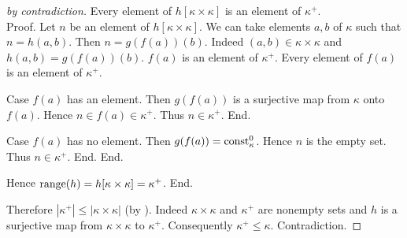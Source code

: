 \documentclass{article}
\begin{document}
\begin{forthel}
\begin{proof}[by contradiction]
        Every element of $h[\kappa \times \kappa]$ is an element of $\kappa^+$. \\
        Proof.
          Let $n$ be an element of $h[\kappa \times \kappa]$.
          We can take elements $a, b$ of $\kappa$ such that $n = h(a,b)$.
          Then $n = g(f(a))(b)$.
          Indeed $(a,b) \in \kappa \times \kappa$ and $h(a,b) = g(f(a))(b)$.
          $f(a)$ is an element of $\kappa^+$.
          Every element of $f(a)$ is an element of $\kappa^+$.

          Case $f(a)$ has an element.
            Then $g(f(a))$ is a surjective map from $\kappa$ onto $f(a)$.
            Hence $n \in f(a) \in \kappa^+$.
            Thus $n \in \kappa^+$.
          End.

          Case $f(a)$ has no element.
            Then $g(f(a)) = \textrm{const}_{\kappa}^{0}$.
            Hence $n$ is the empty set.
            Thus $n \in \kappa^+$.
          End.
        End.

        Hence $\textrm{range}(h) = h[\kappa \times \kappa] = \kappa^+$.
      End.

      Therefore $|\kappa^+| \leq |\kappa \times \kappa|$ (by ).
      Indeed $\kappa \times \kappa$ and $\kappa^+$ are nonempty sets and $h$ is a surjective map from $\kappa \times \kappa$ to $\kappa^+$.
      Consequently $\kappa^+ \leq \kappa$.
      Contradiction.
    \end{proof}
  \end{forthel}

  \printbibliography
\end{document}
